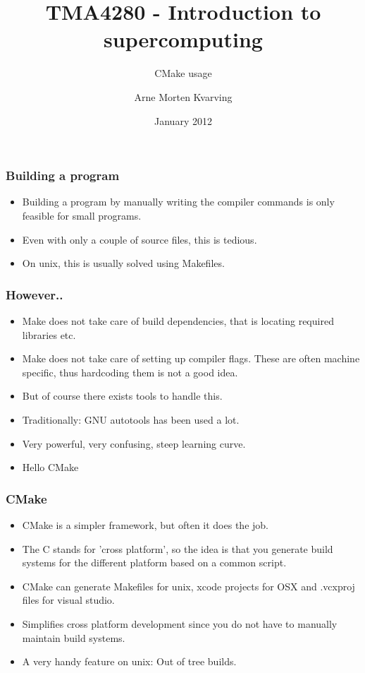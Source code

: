 \documentclass{beamer}
\title{TMA4280 - Introduction to supercomputing}
\subtitle{CMake usage}
\author{Arne Morten Kvarving}
\institute{NTNU and SINTEF ICT}
\date{January 2012}
\begin{document}
\maketitle
\begin{frame}\frametitle{Building a program}
  \begin{itemize}
    \item Building a program by manually writing the compiler commands is only feasible for small programs.
    \item Even with only a couple of source files, this is tedious.
    \item On unix, this is usually solved using Makefiles.
    
  \end{itemize}
\end{frame}
\begin{frame}\frametitle{However..}
  \begin{itemize}
    \item Make does not take care of build dependencies, that is locating required libraries etc.
    \item Make does not take care of setting up compiler flags. These are often machine specific, thus 
          hardcoding them is not a good idea.
    \item But of course there exists tools to handle this.
    \item Traditionally: GNU autotools has been used a lot.
    \item Very powerful, very confusing, steep learning curve.
    \item Hello CMake
  \end{itemize}
\end{frame}
\begin{frame}\frametitle{CMake}
  \begin{itemize}
    \item CMake is a simpler framework, but often it does the job.
    \item The C stands for 'cross platform', so the idea is that
          you generate build systems for the different platform based on a common script.
    \item CMake can generate Makefiles for unix, xcode projects for OSX and 
           .vcxproj files for visual studio.
    \item Simplifies cross platform development since you do not have to manually maintain build systems.
    \item A very handy feature on unix: Out of tree builds.
  \end{itemize}
\end{frame}
\end{document}
